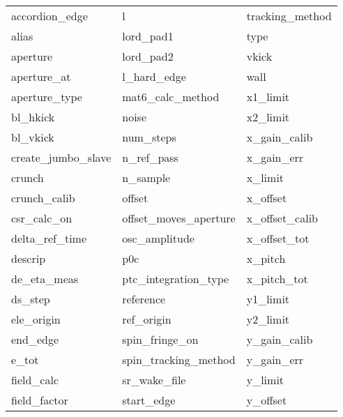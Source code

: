  \begin{tabular}{lll} \toprule
accordion_edge              & l                           & tracking_method             \\
alias                       & lord_pad1                   & type                        \\
aperture                    & lord_pad2                   & vkick                       \\
aperture_at                 & l_hard_edge                 & wall                        \\
aperture_type               & mat6_calc_method            & x1_limit                    \\
bl_hkick                    & noise                       & x2_limit                    \\
bl_vkick                    & num_steps                   & x_gain_calib                \\
create_jumbo_slave          & n_ref_pass                  & x_gain_err                  \\
crunch                      & n_sample                    & x_limit                     \\
crunch_calib                & offset                      & x_offset                    \\
csr_calc_on                 & offset_moves_aperture       & x_offset_calib              \\
delta_ref_time              & osc_amplitude               & x_offset_tot                \\
descrip                     & p0c                         & x_pitch                     \\
de_eta_meas                 & ptc_integration_type        & x_pitch_tot                 \\
ds_step                     & reference                   & y1_limit                    \\
ele_origin                  & ref_origin                  & y2_limit                    \\
end_edge                    & spin_fringe_on              & y_gain_calib                \\
e_tot                       & spin_tracking_method        & y_gain_err                  \\
field_calc                  & sr_wake_file                & y_limit                     \\
field_factor                & start_edge                  & y_offset                    \\

\end{tabular}
